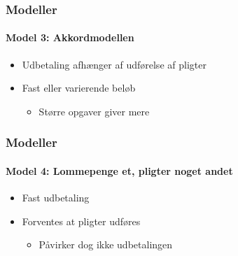 \begin{frame}
\frametitle{Modeller}
\framesubtitle{\textbf{Model 3:} Akkordmodellen}
    \begin{itemize}
        \item{Udbetaling afhænger af udførelse af pligter}
        \item{Fast eller varierende beløb}
            \begin{itemize}
                \item{Større opgaver giver mere}
            \end{itemize}
    \end{itemize}
    \vspace{\baselineskip}
\end{frame}

\begin{frame}
\frametitle{Modeller}
\framesubtitle{\textbf{Model 4:} Lommepenge et, pligter noget andet}
    \begin{itemize}
        \item{Fast udbetaling}
        \item{Forventes at pligter udføres}
            \begin{itemize}
                \item{Påvirker dog ikke udbetalingen}
            \end{itemize}
    \end{itemize}    
    \vspace{\baselineskip}
\end{frame}

